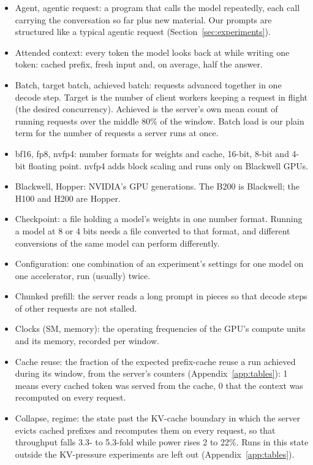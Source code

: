 \documentclass[11pt]{article}
\begin{document}
\begin{small}
\begin{itemize}
\item Agent, agentic request: a program that calls the model repeatedly, each call carrying the conversation so far plus new material. Our prompts are structured like a typical agentic request (Section~\ref{sec:experiments}).
\item Attended context: every token the model looks back at while writing one token: cached prefix, fresh input and, on average, half the answer.
\item Batch, target batch, achieved batch: requests advanced together in one decode step. Target is the number of client workers keeping a request in flight (the desired concurrency). Achieved is the server's own mean count of running requests over the middle 80\% of the window. Batch load is our plain term for the number of requests a server runs at once.
\item bf16, fp8, nvfp4: number formats for weights and cache, 16-bit, 8-bit and 4-bit floating point. nvfp4 adds block scaling and runs only on Blackwell GPUs.
\item Blackwell, Hopper: NVIDIA's GPU generations. The B200 is Blackwell; the H100 and H200 are Hopper.
\item Checkpoint: a file holding a model's weights in one number format. Running a model at 8 or 4 bits needs a file converted to that format, and different conversions of the same model can perform differently.
\item Configuration: one combination of an experiment's settings for one model on one accelerator, run (usually) twice.
\item Chunked prefill: the server reads a long prompt in pieces so that decode steps of other requests are not stalled.
\item Clocks (SM, memory): the operating frequencies of the GPU's compute units and its memory, recorded per window.
\item Cache reuse: the fraction of the expected prefix-cache reuse a run achieved during its window, from the server's counters (Appendix~\ref{app:tables}): 1 means every cached token was served from the cache, 0 that the context was recomputed on every request.
\item Collapse, regime: the state past the KV-cache boundary in which the server evicts cached prefixes and recomputes them on every request, so that throughput falls 3.3- to 5.3-fold while power rises 2 to 22\%. Runs in this state outside the KV-pressure experiments are left out (Appendix~\ref{app:tables}).

\end{itemize}
\end{small}
\end{document}
